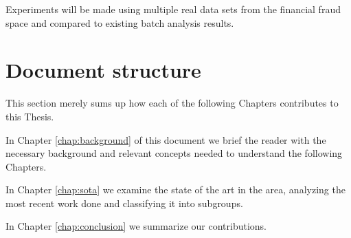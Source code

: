 Experiments will be made using multiple real data sets from the financial fraud space and compared to existing batch analysis results.

\section{Document structure}
This section merely sums up how each of the following Chapters contributes to this Thesis.

In Chapter \ref{chap:background} of this document we brief the reader with the necessary background and relevant concepts needed to understand the following Chapters.

In Chapter \ref{chap:sota} we examine the state of the art in the area, analyzing the most recent work done and classifying it into subgroups.


In Chapter \ref{chap:conclusion} we summarize our contributions.